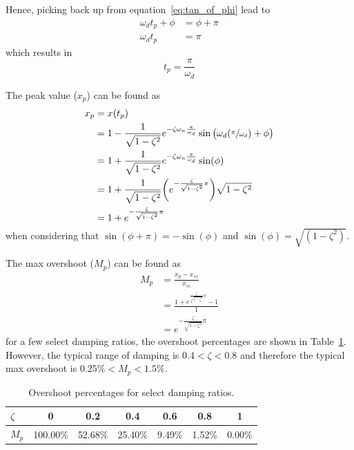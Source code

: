 \documentclass[12pt,letter]{article}
\numberwithin{ex}{section} %
\numberwithin{re}{section} %
\numberwithin{equation}{section}	%
\begin{document}
\noindent Hence, picking back up from equation~\ref{eq:tan_of_phi} lead to
\begin{align}
\omega_d t_p + \phi &= \phi + \pi\\
\omega_d t_p &= \pi \nonumber 
\end{align}
which results in
\begin{equation}
t_p = \frac{\pi}{\omega_d}
\end{equation}



The peak value ($x_p$) can be found as
\begin{align}
x_p &= x(t_p) \\
&= 1 - \frac{1}{ \sqrt{1-\zeta^2}} e^{-\zeta \omega_n \frac{\pi}{\omega_d}} \sin\big(\omega_d (\sfrac{\pi}{\omega_d}) + \phi \big)\nonumber \\
&= 1 + \frac{1}{ \sqrt{1-\zeta^2}} e^{-\zeta \omega_n \frac{\pi}{\omega_d}} \sin(\phi)\nonumber \\
&= 1 + \frac{1}{ \sqrt{1-\zeta^2}} \bigg( e^{- \frac{\zeta}{\sqrt{1-\zeta^2}} \pi} \bigg) \sqrt{1-\zeta^2} \nonumber \\
&= 1 + e^{- \frac{\zeta}{\sqrt{1-\zeta^2}} \pi} \nonumber
\end{align}
when considering that $\sin(\phi + \pi) = -\sin(\phi)$ and $\sin(\phi) = \sqrt{(1-\zeta^2)}$.


The max overshoot ($M_p$) can be found as
\begin{align}
M_p &= \frac{x_p - x_{ss}}{x_{ss}} \\
&= \frac{1 + e^{\frac{\zeta}{\sqrt{1-\zeta^2}}\pi} -1 }{1} \nonumber \\
&= e^{- \frac{\zeta}{\sqrt{1-\zeta^2}} \pi } \nonumber 
\end{align}
for a few select damping ratios, the overshoot percentages are shown in Table~\ref{table:mp_and_damping_ratio}. However, the typical range of damping is $0.4 < \zeta < 0.8$ and therefore the typical max overshoot is $0.25\% < M_p < 1.5\%$.
\begin{table}[H]
\centering
\caption{Overshoot percentages for select damping ratios.}
\label{table:mp_and_damping_ratio}
\begin{tabular}{@{}lcccccc@{}}
\toprule
$\zeta$ & 0 & 0.2 & 0.4 & 0.6 & 0.8 & 1 \\ \midrule 
$M_p$ & 100.00\% & 52.68\% & 25.40\% & 9.49\% & 1.52\% & 0.00\% \\ \bottomrule
\end{tabular}
\end{table}
\end{document}
